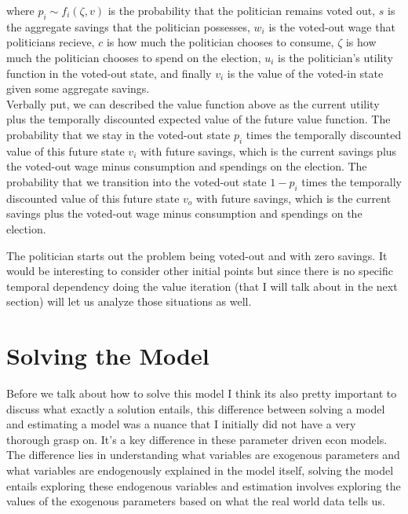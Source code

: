 \documentclass[11pt,english]{article}
\begin{document}
\begin{itemize}
where $p_i \sim f_i(\zeta, v)$ is the probability that the politician remains voted out, $s$ is the aggregate savings that the politician possesses, $w_i$ is the voted-out wage that politicians recieve, $c$ is how much the politician chooses to consume, $\zeta$ is how much the politician chooses to spend on the election, $u_i$ is the politician's utility function in the voted-out state, and finally $v_i$ is the value of the voted-in state given some aggregate savings.\\

\noindent Verbally put, we can described the value function above as the current utility plus the temporally discounted expected value of the future value function. The probability that we stay in the voted-out state $p_i$ times the temporally discounted value of this future state $v_i$ with future savings, which is the current savings plus the voted-out wage minus consumption and spendings on the election. The probability that we transition into the voted-out state $1-p_i$ times the temporally discounted value of this future state $v_o$ with future savings, which is the current savings plus the voted-out wage minus consumption and spendings on the election.

\end{itemize}

\noindent The politician starts out the problem being voted-out and with zero savings. It would be interesting to consider other initial points but since there is no specific temporal dependency doing the value iteration (that I will talk about in the next section) will let us analyze those situations as well.

\section*{Solving the Model}

Before we talk about how to solve this model I think its also pretty important to discuss what exactly a solution entails, this difference between solving a model and estimating a model was a nuance that I initially did not have a very thorough grasp on. It's a key difference in these parameter driven econ models. The difference lies in understanding what variables are exogenous parameters and what variables are endogenously explained in the model itself, solving the model entails exploring these endogenous variables and estimation involves exploring the values of the exogenous parameters based on what the real world data tells us.\\
\end{document}
